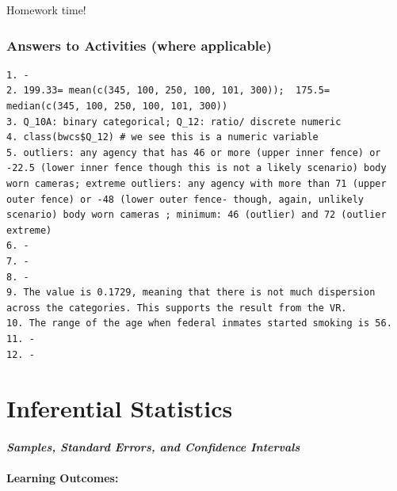 \documentclass[
]{book}
\begin{document}
Homework time!

\hypertarget{answers-to-activities-where-applicable}{%
\subsection{Answers to Activities (where applicable)}\label{answers-to-activities-where-applicable}}

\begin{verbatim}
1. -
2. 199.33= mean(c(345, 100, 250, 100, 101, 300));  175.5= median(c(345, 100, 250, 100, 101, 300))
3. Q_10A: binary categorical; Q_12: ratio/ discrete numeric 
4. class(bwcs$Q_12) # we see this is a numeric variable
5. outliers: any agency that has 46 or more (upper inner fence) or -22.5 (lower inner fence though this is not a likely scenario) body worn cameras; extreme outliers: any agency with more than 71 (upper outer fence) or -48 (lower outer fence- though, again, unlikely scenario) body worn cameras ; minimum: 46 (outlier) and 72 (outlier extreme)
6. -
7. -
8. -
9. The value is 0.1729, meaning that there is not much dispersion across the categories. This supports the result from the VR.
10. The range of the age when federal inmates started smoking is 56.
11. -
12. -
\end{verbatim}

\hypertarget{inferential-statistics}{%
\chapter{Inferential Statistics}\label{inferential-statistics}}

\hypertarget{samples-standard-errors-and-confidence-intervals}{%
\subsubsection*{\texorpdfstring{\emph{Samples, Standard Errors, and Confidence Intervals}}{Samples, Standard Errors, and Confidence Intervals}}\label{samples-standard-errors-and-confidence-intervals}}

\hypertarget{learning-outcomes-4}{%
\subsubsection*{\texorpdfstring{\textbf{Learning Outcomes:}}{Learning Outcomes:}}\label{learning-outcomes-4}}
\end{document}

